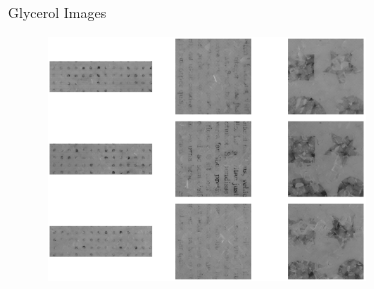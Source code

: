 \documentclass[10pt]{beamer}
\begin{document}
\begin{frame}{Glycerol Images}
\begin{figure}
    \centering
    \includegraphics[width = 0.75\textwidth]{figs/Gly_Imgs.pdf}
    \label{ex_shapes}
\end{figure}
    
\end{frame}
\end{document}
